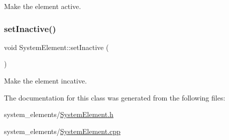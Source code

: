 Make the element active. \mbox{\label{classSystemElement_aaa601d0e2960dd62d68e0f025f5eb362}} 
\subsubsection{\texorpdfstring{set\+Inactive()}{setInactive()}}
{\footnotesize\ttfamily void System\+Element\+::set\+Inactive (\begin{DoxyParamCaption}{ }\end{DoxyParamCaption})}

Make the element incative. 

The documentation for this class was generated from the following files\+:\begin{DoxyCompactItemize}
\item 
system\+\_\+elements/\mbox{\hyperlink{SystemElement_8h}{System\+Element.\+h}}\item 
system\+\_\+elements/\mbox{\hyperlink{SystemElement_8cpp}{System\+Element.\+cpp}}\end{DoxyCompactItemize}
